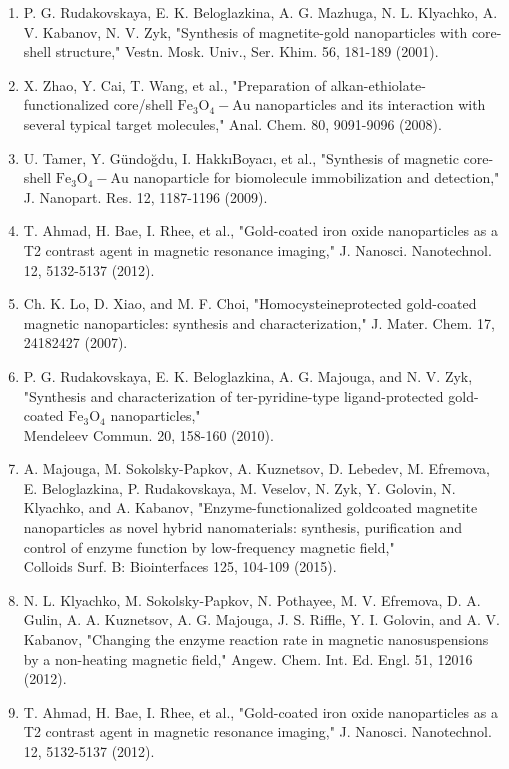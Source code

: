 \documentclass[10pt, a4paper]{article}
\begin{document}
\begin{enumerate}
  \item P. G. Rudakovskaya, E. K. Beloglazkina, A. G. Mazhuga, N. L. Klyachko, A. V. Kabanov, N. V. Zyk, "Synthesis of magnetite-gold nanoparticles with core-shell structure," Vestn. Mosk. Univ., Ser. Khim. 56, 181-189 (2001).
  \item X. Zhao, Y. Cai, T. Wang, et al., "Preparation of alkan-ethiolate-functionalized core/shell \(\mathrm{Fe}_{3} \mathrm{O}_{4}-\mathrm{Au}\) nanoparticles and its interaction with several typical target molecules," Anal. Chem. 80, 9091-9096 (2008).
  \item U. Tamer, Y. Gündoğdu, I. HakkıBoyacı, et al., "Synthesis of magnetic core-shell \(\mathrm{Fe}_{3} \mathrm{O}_{4}-\mathrm{Au}\) nanoparticle for biomolecule immobilization and detection," J. Nanopart. Res. 12, 1187-1196 (2009).
  \item T. Ahmad, H. Bae, I. Rhee, et al., "Gold-coated iron oxide nanoparticles as a T2 contrast agent in magnetic resonance imaging," J. Nanosci. Nanotechnol. 12, 5132-5137 (2012).
  \item Ch. K. Lo, D. Xiao, and M. F. Choi, "Homocysteineprotected gold-coated magnetic nanoparticles: synthesis and characterization," J. Mater. Chem. 17, 24182427 (2007).
  \item P. G. Rudakovskaya, E. K. Beloglazkina, A. G. Majouga, and N. V. Zyk, "Synthesis and characterization of ter-pyridine-type ligand-protected gold-coated \(\mathrm{Fe}_{3} \mathrm{O}_{4}\) nanoparticles," \\
  Mendeleev Commun. 20, 158-160 (2010).
  \item A. Majouga, M. Sokolsky-Papkov, A. Kuznetsov, D. Lebedev, M. Efremova, E. Beloglazkina, P. Rudakovskaya, M. Veselov, N. Zyk, Y. Golovin, N. Klyachko, and A. Kabanov, "Enzyme-functionalized goldcoated magnetite nanoparticles as novel hybrid nanomaterials: synthesis, purification and control of enzyme function by low-frequency magnetic field," \\
  Colloids Surf. B: Biointerfaces 125, 104-109 (2015).
  \item N. L. Klyachko, M. Sokolsky-Papkov, N. Pothayee, M. V. Efremova, D. A. Gulin, A. A. Kuznetsov, A. G. Majouga, J. S. Riffle, Y. I. Golovin, and A. V. Kabanov, "Changing the enzyme reaction rate in magnetic nanosuspensions by a non-heating magnetic field," Angew. Chem. Int. Ed. Engl. 51, 12016 (2012).
  \item T. Ahmad, H. Bae, I. Rhee, et al., "Gold-coated iron oxide nanoparticles as a T2 contrast agent in magnetic resonance imaging," J. Nanosci. Nanotechnol. 12, 5132-5137 (2012).

\end{enumerate}
\end{document}
